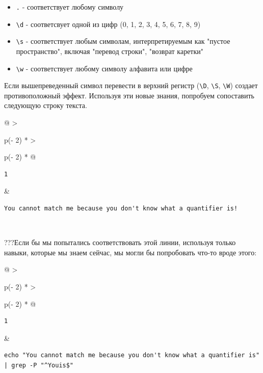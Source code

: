 \documentclass{report}
\begin{document}
\begin{itemize}
\tightlist
\item
  \texttt{.} - соответствует любому символу
\item
  \texttt{\textbackslash{}d} - соответсвует одной из цифр (0, 1, 2, 3,
  4, 5, 6, 7, 8, 9)
\item
  \texttt{\textbackslash{}s} - соответствует любым символам,
  интерпретируемым как "пустое пространство", включая "перевод строки",
  "возврат каретки"
\item
  \texttt{\textbackslash{}w} - соответствует любому символу алфавита или
  цифре
\end{itemize}

Если вышепреведенный символ перевести в верхний регистр
(\texttt{\textbackslash{}D}, \texttt{\textbackslash{}S},
\texttt{\textbackslash{}W}) создает противоположный эффект. Используя
эти новые знания, попробуем сопоставить следующую строку текста.

\begin{longtable}[]{@{}
  >{\raggedright\arraybackslash}p{(\columnwidth - 2\tabcolsep) * }
  >{\raggedright\arraybackslash}p{(\columnwidth - 2\tabcolsep) * }@{}}
\toprule
\endhead
\begin{minipage}[t]{\linewidth}\raggedright
\begin{verbatim}
1
\end{verbatim}
\end{minipage} & \begin{minipage}[t]{\linewidth}\raggedright
\begin{verbatim}
You cannot match me because you don't know what a quantifier is!
\end{verbatim}
\end{minipage} \\ \addlinespace
\bottomrule
\end{longtable}

???Если бы мы попытались соответствовать этой линии, используя только
навыки, которые мы знаем сейчас, мы могли бы попробовать что-то вроде
этого:

\begin{longtable}[]{@{}
  >{\raggedright\arraybackslash}p{(\columnwidth - 2\tabcolsep) * }
  >{\raggedright\arraybackslash}p{(\columnwidth - 2\tabcolsep) * }@{}}
\toprule
\endhead
\begin{minipage}[t]{\linewidth}\raggedright
\begin{verbatim}
1
\end{verbatim}
\end{minipage} & \begin{minipage}[t]{\linewidth}\raggedright
\begin{verbatim}
echo "You cannot match me because you don't know what a quantifier is" | grep -P "^Youis$"
\end{verbatim}
\end{minipage} \\ \addlinespace
\bottomrule
\end{longtable}
\end{document}
